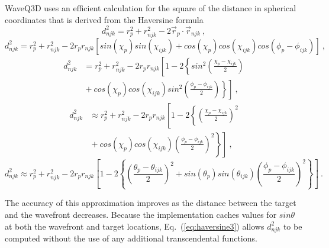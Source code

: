 \documentclass{ws-jca}
\begin{document}
WaveQ3D uses an efficient calculation for the square of the distance in spherical
coordinates that is derived from the Haversine formula\cite{Sinnott1984}
\begin{equation}
	d^2_{njk} = r^2_{p} + r^2_{njk} - 2 \vec{r}_{p} \cdot \vec{r}_{njk} \:,
	\label{eq:pythagoras1}
\end{equation}
\begin{equation}
	d^2_{njk} = r^2_{p} + r^2_{njk} - 2 r_{p} r_{njk}
	\left[ sin(\chi_{p}) sin(\chi_{ijk})
	+ cos(\chi_{p}) cos(\chi_{ijk}) cos(\phi_{p}-\phi_{ijk}) \right] \:,
	\label{eq:pythagoras2}
\end{equation}
\begin{align}
	d^2_{njk} &= r^2_{p} + r^2_{njk} - 2 r_{p} r_{njk}
	\left[ 1 - 2 \left\{ sin^2 \left( \frac{\chi_{p}-\chi_{ijk}}{2} \right) 
		\right.\right.\nonumber\\
	&\left.\left. {} + cos(\chi_{p}) cos(\chi_{ijk}) sin^2 
		\left( \frac{\phi_{p}-\phi_{ijk}}{2} \right) \right\} \right] \:,
\label{eq:haversine1}
\end{align}
\begin{align}
	d^2_{njk} &\approx r^2_{p} + r^2_{njk} - 2 r_{p} r_{njk}
	\left[ 1 - 2 \left\{ \left( \frac{\chi_{p}-\chi_{ijk}}{2} \right)^2 
		\right.\right.\nonumber\\
	&\left.\left. {} + cos(\chi_{p}) cos(\chi_{ijk}) 
		\left( \frac{\phi_{p}-\phi_{ijk}}{2} \right)^2 \right\} \right] \:,
	\label{eq:haversine2}
\end{align}
\begin{equation}
	d^2_{njk} \approx r^2_{p} + r^2_{njk} - 2 r_{p} r_{njk}
	\left[ 1 - 2 \left\{ \left( \frac{\theta_{p}-\theta_{ijk}}{2} \right)^2
		+ sin(\theta_{p}) sin(\theta_{ijk}) 
		\left( \frac{\phi_{p}-\phi_{ijk}}{2} \right)^2 \right\} \right] \:.
	\label{eq:haversine3}
\end{equation}

The accuracy of this approximation improves as the distance between the
target and the wavefront decreases. Because the implementation caches values for
\(sin\theta\) at both the wavefront and target locations,
Eq.~(\ref{eq:haversine3}) allows \(d^2_{njk}\) to be computed without the
use of any additional transcendental functions.
\end{document}
